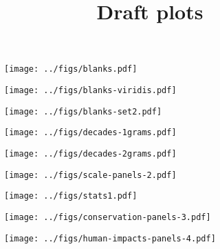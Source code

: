 \documentclass[12pt]{article}
\title{Draft plots}
\author{}
\begin{document}
\maketitle




\restoregeometry

\clearpage


% 

\begin{figure}[htbp]
\centering
\texttt{[image: ../figs/blanks.pdf]}
\caption{}
\end{figure}

\begin{figure}[htbp]
\centering
\texttt{[image: ../figs/blanks-viridis.pdf]}
\caption{}
\end{figure}

\begin{figure}[htbp]
\centering
\texttt{[image: ../figs/blanks-set2.pdf]}
\caption{}
\end{figure}

\begin{figure}[htbp]
\centering
\texttt{[image: ../figs/decades-1grams.pdf]}
\caption{}
\end{figure}

\begin{figure}[htbp]
\centering
\texttt{[image: ../figs/decades-2grams.pdf]}
\caption{}
\end{figure}

\begin{figure}[htbp]
\centering
\texttt{[image: ../figs/scale-panels-2.pdf]}
\caption{}
\end{figure}

\begin{figure}[htbp]
\centering
\texttt{[image: ../figs/stats1.pdf]}
\caption{}
\end{figure}


\begin{figure}[htbp]
\centering
\texttt{[image: ../figs/conservation-panels-3.pdf]}
\caption{}
\end{figure}

\begin{figure}[htbp]
\centering
\texttt{[image: ../figs/human-impacts-panels-4.pdf]}
\caption{}
\end{figure}



\clearpage

\end{document}
